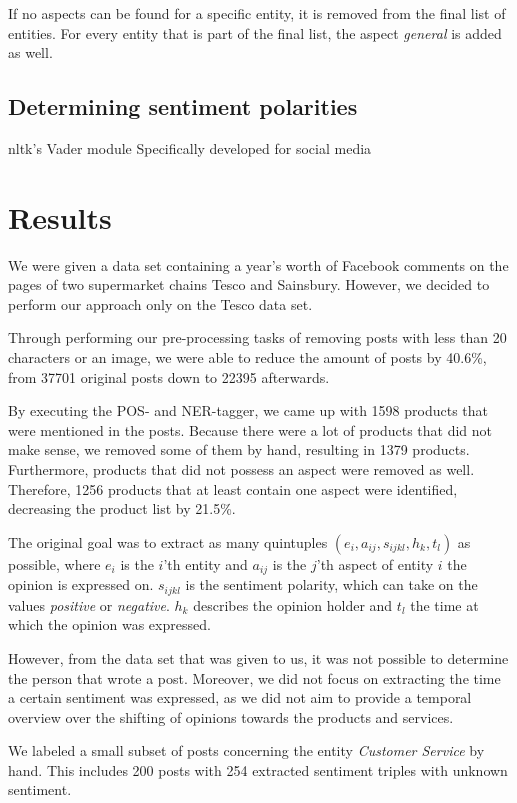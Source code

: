 \documentclass[10pt,a4paper]{article}
\begin{document}
		If no aspects can be found for a specific entity, it is removed from the final list of entities.
		For every entity that is part of the final list, the aspect \textit{general} is added as well.

		\subsection{Determining sentiment polarities}
		nltk's Vader module
		Specifically developed for social media \cite{vader}
	\section{Results}
	\label{sec:results}
	
	We were given a data set containing a year's worth of Facebook comments on the pages of two supermarket chains Tesco and Sainsbury. However, we decided to perform our approach only on the Tesco data set.
	
	Through performing our pre-processing tasks of removing posts with less than 20 characters or an image, we were able to reduce the amount of posts by 40.6\%, from 37701 original posts down to 22395 afterwards.

	By executing the POS- and NER-tagger, we came up with 1598 products that were mentioned in the posts. Because there were a lot of products that did not make sense, we removed some of them by hand, resulting in 1379 products. Furthermore, products that did not possess an aspect were removed as well. Therefore, 1256 products that at least contain one aspect were identified, decreasing the product list by 21.5\%. 

	The original goal was to extract as many quintuples $(e_i, a_{ij}, s_{ijkl}, h_k, t_l)$ as possible, where $e_i$ is the $i$'th entity and $a_{ij}$ is the $j$'th aspect of entity $i$ the opinion is expressed on. $s_{ijkl}$ is the sentiment polarity, which can take on the values \textit{positive} or \textit{negative}. $h_k$ describes the opinion holder and $t_l$ the time at which the opinion was expressed.

	However, from the data set that was given to us, it was not possible to determine the person that wrote a post. Moreover, we did not focus on extracting the time a certain sentiment was expressed, as we did not aim to provide a temporal overview over the shifting of opinions towards the products and services.
	
	

	We labeled a small subset of posts concerning the entity \textit{Customer Service} by hand. This includes 200 posts with 254 extracted sentiment triples with unknown sentiment.
\end{document}
